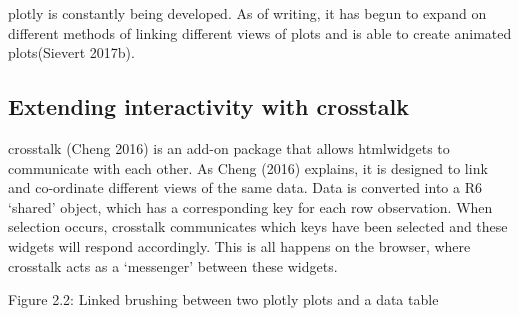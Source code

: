 \documentclass[11pt,]{report}
\newenvironment{Shaded}{\begin{snugshade}}{\end{snugshade}}
\newcommand{\KeywordTok}[1]{\textcolor[rgb]{0.13,0.29,0.53}{\textbf{#1}}}
\newcommand{\DataTypeTok}[1]{\textcolor[rgb]{0.13,0.29,0.53}{#1}}
\newcommand{\DecValTok}[1]{\textcolor[rgb]{0.00,0.00,0.81}{#1}}
\newcommand{\StringTok}[1]{\textcolor[rgb]{0.31,0.60,0.02}{#1}}
\newcommand{\CommentTok}[1]{\textcolor[rgb]{0.56,0.35,0.01}{\textit{#1}}}
\newcommand{\OperatorTok}[1]{\textcolor[rgb]{0.81,0.36,0.00}{\textbf{#1}}}
\newcommand{\NormalTok}[1]{#1}
\begin{document}
\textsf{plotly} is constantly being developed. As of writing, it has
begun to expand on different methods of linking different views of plots
and is able to create animated plots(Sievert 2017b).

\subsection{Extending interactivity with
crosstalk}\label{extending-interactivity-with-crosstalk}

\textsf{crosstalk} (Cheng 2016) is an add-on package that allows
htmlwidgets to communicate with each other. As Cheng (2016) explains, it
is designed to link and co-ordinate different views of the same data.
Data is converted into a R6 `shared' object, which has a corresponding
key for each row observation. When selection occurs, \textsf{crosstalk}
communicates which keys have been selected and these widgets will
respond accordingly. This is all happens on the browser, where crosstalk
acts as a `messenger' between these widgets.

Figure 2.2: Linked brushing between two plotly plots and a data table

\begin{Shaded}
\end{Shaded}
\end{document}
